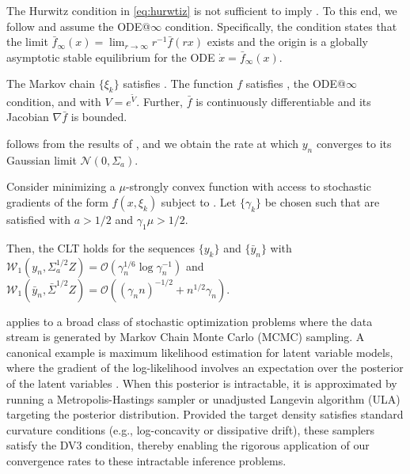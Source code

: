 \documentclass[11pt]{article}
\begin{document}
The Hurwitz condition in \eqref{eq:hurwtiz} is not sufficient to imply .  
To this end, we follow \citep{borkar25} and assume the ODE@$\infty$ condition. 
Specifically, the condition states that the limit $\bar{f}_\infty (x) = \lim_{r \to \infty} r^{-1} \bar{f}(r x)$ exists and the origin is a globally asymptotic stable equilibrium for the ODE $\dot{x} = \bar{f}_\infty (x)$. 
\begin{sgd}\label{ass:sgd}
    The Markov chain $\{\xi_k\}$ satisfies .  
    The function $f$ satisfies , the ODE@$\infty$ condition, and  with $V = e^{\tilde{V}}$. 
    Further, $\bar{f}$ is continuously differentiable and its Jacobian $\nabla \bar{f}$ is bounded. 
\end{sgd}

 follows from the results of \citep{borkar25}, and we obtain the rate at which $y_n$ converges to its Gaussian limit $\mathcal{N}(0, \Sigma_a)$. 
\begin{theorem}\label{thm:mcmc}
    Consider minimizing a $\mu$-strongly convex function with access to stochastic gradients of the form $f(x, \xi_k)$ subject to . 
    Let $\{\gamma_k\}$ be chosen such that  are satisfied with $a > 1/2$ and $\gamma_1 \mu > 1/2$. 

    Then, the CLT holds for the sequences $\{y_k\}$ and $\{\bar{y}_n\}$ with $\mathcal{W}_1(y_n, \Sigma_a^{1/2}Z) = \mathcal{O}(\gamma_n^{1/6} \log \gamma_n^{-1})$ and $\mathcal{W}_1 (\bar{y}_n, \bar{\Sigma}^{1/2} Z) = \mathcal{O}( (\gamma_n n)^{-1/2} + n^{1/2} \gamma_n)$. 
\end{theorem}
 applies to a broad class of stochastic optimization problems where the data stream is generated by Markov Chain Monte Carlo (MCMC) sampling. 
A canonical example is maximum likelihood estimation for latent variable models, where the gradient of the log-likelihood involves an expectation over the posterior of the latent variables \citep{geyer1994convergence}. 
When this posterior is intractable, it is approximated by running a Metropolis-Hastings sampler or unadjusted Langevin algorithm (ULA) targeting the posterior distribution. 
Provided the target density satisfies standard curvature conditions (e.g., log-concavity or dissipative drift), these samplers satisfy the DV3 condition, thereby enabling the rigorous application of our convergence rates to these intractable inference problems.
\end{document}

